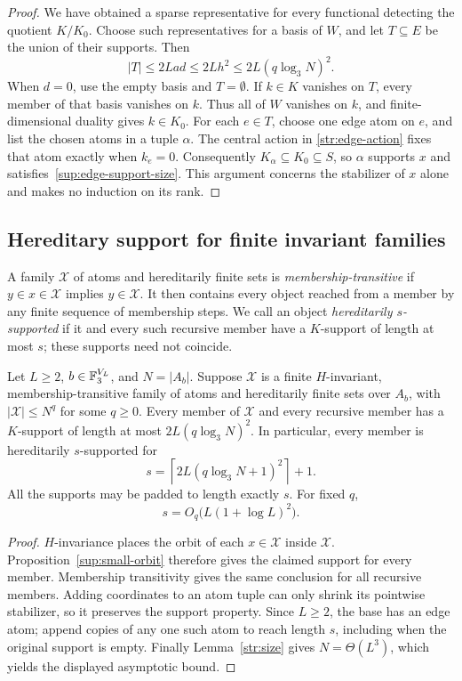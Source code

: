 \begin{proof}
We have obtained a sparse representative for every functional detecting
the quotient $K/K_0$. Choose such representatives for a basis of $W$,
and let $T\subseteq E$ be the union of their supports. Then
\begin{equation}\label{sup:edge-support-size}
 |T|\le2Lad\le2Lh^2\le2L(q\log_3N)^2.
\end{equation}
When $d=0$, use the empty basis and $T=\emptyset$. If $k\in K$
vanishes on $T$, every member of that basis vanishes on $k$. Thus all
of $W$ vanishes on $k$, and finite-dimensional duality gives $k\in K_0$.
For each $e\in T$, choose one edge atom on $e$, and list the chosen
atoms in a tuple $\alpha$. The central action in
\eqref{str:edge-action} fixes that atom exactly when $k_e=0$.
Consequently $K_\alpha\subseteq K_0\subseteq S$, so $\alpha$ supports
$x$ and satisfies~\eqref{sup:edge-support-size}. This argument concerns
the stabilizer of $x$ alone and makes no induction on its rank.
\end{proof}

\subsection{Hereditary support for finite invariant families}

A family $\mathcal X$ of atoms and hereditarily finite sets is
\emph{membership-transitive} if $y\in x\in\mathcal X$ implies
$y\in\mathcal X$. It then contains every object reached from a member
by any finite sequence of membership steps. We call an object
\emph{hereditarily $s$-supported} if it and every such recursive member
have a $K$-support of length at most $s$; these supports need not coincide.

\begin{corollary}\label{sup:hereditary}
Let $L\ge2$, $b\in\mathbb F_3^{V_L}$, and $N=|A_b|$. Suppose $\mathcal X$ is
a finite $H$-invariant, membership-transitive family of atoms and
hereditarily finite sets over $A_b$, with $|\mathcal X|\le N^q$ for
some $q\ge0$. Every member of $\mathcal X$ and every recursive member
has a $K$-support of length at most $2L(q\log_3N)^2$. In particular,
every member is hereditarily $s$-supported for
\begin{equation}\label{sup:length}
 s=\left\lceil2L(q\log_3N+1)^2\right\rceil+1.
\end{equation}
All the supports may be padded to length exactly $s$. For fixed $q$,
\[
 s=O_q\bigl(L(1+\log L)^2\bigr).
\]
\end{corollary}

\begin{proof}
$H$-invariance places the orbit of each $x\in\mathcal X$ inside
$\mathcal X$. Proposition~\ref{sup:small-orbit} therefore gives the
claimed support for every member. Membership transitivity gives the
same conclusion for all recursive members. Adding coordinates to an
atom tuple can only shrink its pointwise stabilizer, so it preserves
the support property. Since $L\ge2$, the base has an edge atom; append
copies of any one such atom to reach length $s$, including when the
original support is empty. Finally Lemma~\ref{str:size} gives
$N=\Theta(L^3)$, which yields the displayed asymptotic bound.
\end{proof}
